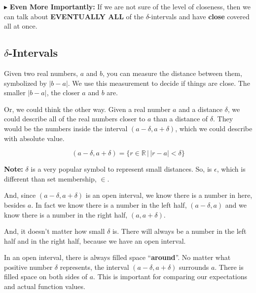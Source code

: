 \documentclass{ximera}
\begin{document}
\textbf{\textcolor{red!70!darkgray}{$\blacktriangleright$}} \textbf{\textcolor{purple!85!blue}{Even More Importantly:}} If we are not sure of the level of closeness, then we can talk about \textbf{\textcolor{red!70!black}{EVENTUALLY ALL}} of the $\delta$-intervals and have \textbf{\textcolor{red!70!black}{close}} covered all at once.





















\subsection*{$\delta$-Intervals}



Given two real numbers, $a$ and $b$, you can measure the distance between them, symbolized by $|b-a|$.  We use this measurement to decide if things are close.  The smaller $|b-a|$, the closer $a$ and $b$ are. 



Or, we could think the other way.  Given a real number $a$ and a distance $\delta$, we could describe all of the real numbers closer to $a$ than a distance of $\delta$.  They would be the numbers inside the interval $(a-\delta, a+\delta)$, which we could describe with absolute value.

\[      (a-\delta, a+\delta) = \{ r \in \mathbb{R} \, | \, |r - a| < \delta        \}       \]


\textbf{Note:}  $\delta$ is a very popular symbol to represent small distances.  So, is $\epsilon$, which is different than set membership, $\in$.



And, since $(a-\delta, a+\delta)$ is an open interval, we know there is a number in here, besides $a$.  In fact we know there is a number in the left half, $(a-\delta, a)$ and we know there is a number in the right half, $(a, a+\delta)$.


And, it doesn't matter how small $\delta$ is.  There will always be a number in the left half and in the right half, because we have an open interval.


In an open interval, there is always filled space ``\textbf{\textcolor{purple!85!blue}{around}}''.  No matter what positive number $\delta$ represents, the interval $(a-\delta, a+\delta)$ surrounds $a$.  There is filled space on both sides of $a$. This is important for comparing our expectations and actual function values.
\end{document}
